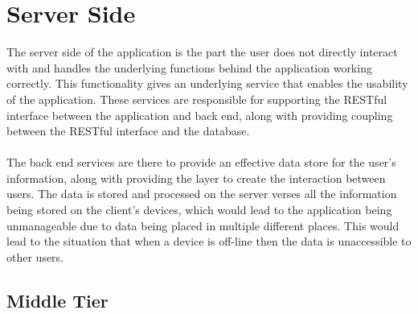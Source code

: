 \section{Server Side}
\label{sec:server_side_design}

The server side of the application is the part the user does not directly interact with and handles the underlying functions behind the application working correctly. This functionality gives an underlying service that enables the usability of the application. These services are responsible for supporting the RESTful interface between the application and back end, along with providing coupling between the RESTful interface and the database.\\
\\
The back end services are there to provide an effective data store for the user's information, along with providing the layer to create the interaction between users. The data is stored and processed on the server verses all the information being stored on the client's devices, which would lead to the application being unmanageable due to data being placed in multiple different places. This would lead to the situation that when a device is off-line then the data is unaccessible to other users.\\

\subsection{Middle Tier}

